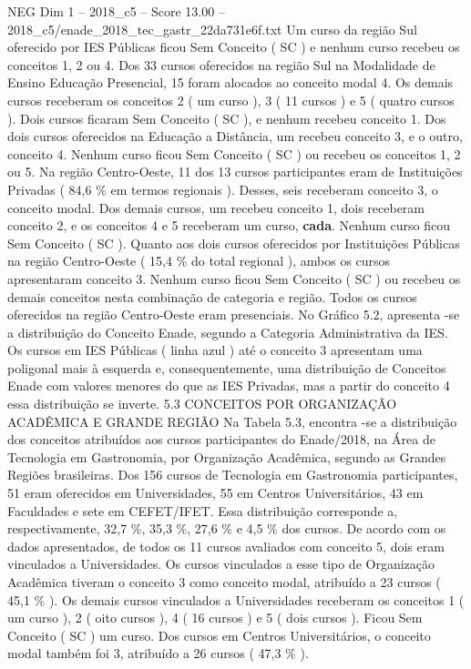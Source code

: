 \begin{textsample}{NEG Dim 1 – 2018\_c5 – Score 13.00 – 2018\_c5/enade\_2018\_tec\_gastr\_22da731e6f.txt}
Um curso da região Sul oferecido por IES Públicas ficou Sem Conceito ( SC ) e nenhum curso recebeu os conceitos 1, 2 ou 4.
Dos 33 cursos oferecidos na região Sul na Modalidade de Ensino Educação Presencial, 15 foram alocados ao conceito modal 4.
Os demais cursos receberam os conceitos 2 ( um curso ), 3 ( 11 cursos ) e 5 ( quatro cursos ).
Dois cursos ficaram Sem Conceito ( SC ), e nenhum recebeu conceito 1.
Dos dois cursos oferecidos na Educação a Distância, um recebeu conceito 3, e o outro, conceito 4.
Nenhum curso ficou Sem Conceito ( SC ) ou recebeu os conceitos 1, 2 ou 5.
Na região Centro-Oeste, 11 dos 13 cursos participantes eram de Instituições Privadas ( 84,6 \% em termos regionais ).
Desses, seis receberam conceito 3, o conceito modal.
Dos demais cursos, um recebeu conceito 1, dois receberam conceito 2, e os conceitos 4 e 5 receberam um curso, \textbf{cada}.
Nenhum curso ficou Sem Conceito ( SC ).
Quanto aos dois cursos oferecidos por Instituições Públicas na região Centro-Oeste ( 15,4 \% do total regional ), ambos os cursos apresentaram conceito 3.
Nenhum curso ficou Sem Conceito ( SC ) ou recebeu os demais conceitos nesta combinação de categoria e região.
Todos os cursos oferecidos na região Centro-Oeste eram presenciais.
No Gráfico 5.2, apresenta -se a distribuição do Conceito Enade, segundo a Categoria Administrativa da IES.
Os cursos em IES Públicas ( linha azul ) até o conceito 3 apresentam uma poligonal mais à esquerda e, consequentemente, uma distribuição de Conceitos Enade com valores menores do que as IES Privadas, mas a partir do conceito 4 essa distribuição se inverte. 5.3 CONCEITOS POR ORGANIZAÇÃO ACADÊMICA E GRANDE REGIÃO Na Tabela 5.3, encontra -se a distribuição dos conceitos atribuídos aos cursos participantes do Enade/2018, na Área de Tecnologia em Gastronomia, por Organização Acadêmica, segundo as Grandes Regiões brasileiras.
Dos 156 cursos de Tecnologia em Gastronomia participantes, 51 eram oferecidos em Universidades, 55 em Centros Universitários, 43 em Faculdades e sete em CEFET/IFET.
Essa distribuição corresponde a, respectivamente, 32,7 \%, 35,3 \%, 27,6 \% e 4,5 \% dos cursos.
De acordo com os dados apresentados, de todos os 11 cursos avaliados com conceito 5, dois eram vinculados a Universidades.
Os cursos vinculados a esse tipo de Organização Acadêmica tiveram o conceito 3 como conceito modal, atribuído a 23 cursos ( 45,1 \% ).
Os demais cursos vinculados a Universidades receberam os conceitos 1 ( um curso ), 2 ( oito cursos ), 4 ( 16 cursos ) e 5 ( dois cursos ).
Ficou Sem Conceito ( SC ) um curso.
Dos cursos em Centros Universitários, o conceito modal também foi 3, atribuído a 26 cursos ( 47,3 \% ).

\end{textsample}
